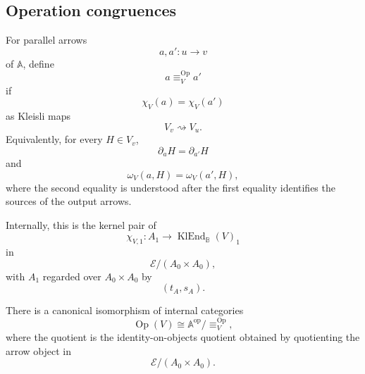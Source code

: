 \subsection{Operation congruences}
\label{subsec:operation-congruences}

\begin{definition}
\label{def:operation-congruence}
    For parallel arrows
    \[
        a,a':u\to v
    \]
    of \(\mathbb A\), define
    \[
        a\equiv^{\operatorname{Op}}_V a'
    \]
    if
    \[
        \chi_V(a)=\chi_V(a')
    \]
    as Kleisli maps
    \[
        V_v\rightsquigarrow V_u.
    \]
    Equivalently, for every \(H\in V_v\),
    \[
        \partial_aH=\partial_{a'}H
    \]
    and
    \[
        \omega_V(a,H)=\omega_V(a',H),
    \]
    where the second equality is understood after the first equality identifies
    the sources of the output arrows.
\end{definition}

Internally, this is the kernel pair of
\[
    \chi_{V,1}:A_1\to\operatorname{KlEnd}_{\mathbb B}(V)_1
\]
in
\[
    \mathcal E/(A_0\times A_0),
\]
with \(A_1\) regarded over \(A_0\times A_0\) by
\[
    (t_A,s_A).
\]

\begin{theorem}
\label{thm:operation-image-quotient}
    There is a canonical isomorphism of internal categories
    \[
        \operatorname{Op}(V)
        \cong
        \mathbb A^{\mathrm{op}}/{\equiv^{\operatorname{Op}}_V},
    \]
    where the quotient is the identity-on-objects quotient obtained by
    quotienting the arrow object in
    \[
        \mathcal E/(A_0\times A_0).
    \]
\end{theorem}

